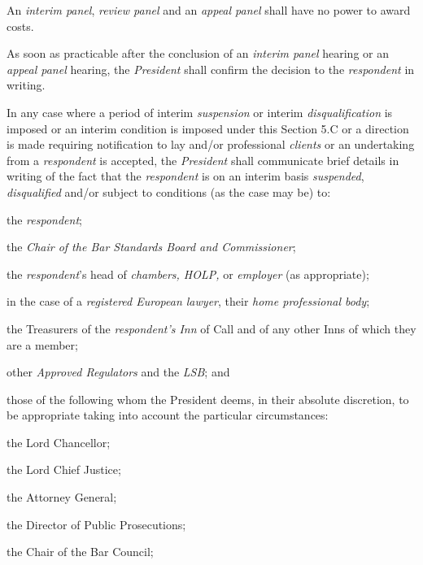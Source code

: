 An \emph{interim panel}, \emph{review panel} and an \emph{appeal
panel} shall have no power to award costs.\\
\par
{}
As soon as practicable after the conclusion of an\emph{ interim
panel} hearing or an \emph{appeal panel} hearing,
the \emph{President} shall confirm the decision to
the \emph{respondent} in writing.\\
\par
In any case where a period of interim \emph{suspension} or
interim \emph{disqualification} is imposed or an interim condition is
imposed under this Section 5.C or a direction is made requiring
notification to lay and/or professional \emph{clients} or an undertaking
from a \emph{respondent} is accepted, the \emph{President} shall
communicate brief details in writing of the fact that
the \emph{respondent} is on an interim
basis \emph{suspended}, \emph{disqualified} and/or subject to conditions
(as the case may be) to:\\\nl \item the \emph{respondent};\item the \emph{Chair of the Bar Standards Board and Commissioner};\item the \emph{respondent}'s head of \emph{chambers,
HOLP, }or \emph{employer} (as appropriate);\item in the case of a \emph{registered European lawyer}, their \emph{home
professional body};\item the Treasurers of the \emph{respondent's Inn }of Call\emph{ }and of
any other Inns of which they are a member;\item other \emph{Approved Regulators} and the \emph{LSB}; and\item those of the following whom the President deems, in their absolute
discretion, to be appropriate taking into account the particular
circumstances:\al
\item the Lord Chancellor;\\
\item the Lord Chief Justice;\\
\item the Attorney General;\\
\item the Director of Public Prosecutions;\\
\item the Chair of the Bar Council;\\

